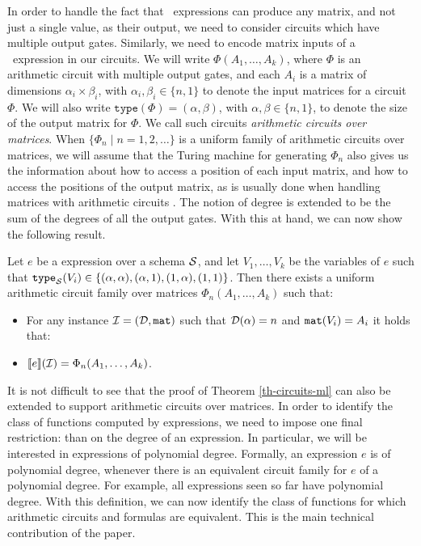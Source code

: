 In order to handle the fact that \langfor\ expressions can produce any matrix, and not just a single value, as their output, we need to consider circuits which have multiple output gates. Similarly, we need to encode matrix inputs of a \langfor\ expression in our circuits. We will write $\Phi(A_1,\ldots ,A_k)$, where $\Phi$ is an arithmetic circuit with multiple output gates, and each $A_i$ is a matrix of dimensions $\alpha_i\times \beta_i$, with $\alpha_i,\beta_i \in \{n,1\}$ to denote the input matrices for a circuit $\Phi$. We will also write $\texttt{type}(\Phi)=(\alpha,\beta)$, with $\alpha,\beta\in \{n,1\}$, to denote the size of the output matrix for $\Phi$. We call such circuits \textit{arithmetic circuits over matrices}. When $\{\Phi_n\mid n=1,2,\ldots\}$ is a uniform family of arithmetic circuits over matrices, we will assume that the Turing machine for generating $\Phi_n$ also gives us the information about how to access a position of each input matrix, and how to access the positions of the output matrix, as is usually done when handling matrices with arithmetic circuits \cite{Raz02}. The notion of degree is extended to be the sum of the degrees of all the output gates. With this  at hand, we can now show the following result.

\begin{theorem}
\label{th-ml-to-circuits}
Let $e$ be a \langfor expression over a schema $\mathcal{S}$, and let $V_1,\ldots ,V_k$ be the variables of $e$ such that $\texttt{type}_{\mathcal{S}}(V_i)\in \{(\alpha,\alpha), (\alpha,1), (1,\alpha), (1,1)\}$. Then there exists a uniform arithmetic circuit family over matrices $\Phi_n(A_1,\ldots ,A_k)$ such that:
\begin{itemize}
\item For any instance $\mathcal{I} = (\mathcal{D},\texttt{mat})$ such that $\mathcal{D}(\alpha) = n$ and $\texttt{mat}(V_i) = A_i$ it holds that:
\item $\llbracket e \rrbracket(\mathcal{I}) = \Phi_n(A_1,\ldots ,A_k)$.
\end{itemize}
\end{theorem}



It is not difficult to see that the proof of Theorem \ref{th-circuits-ml} can also be extended to support arithmetic circuits over matrices. In order to identify the class of functions computed by \langfor expressions, we need to impose one final restriction: than on the degree of an expression. 
In particular, we will be interested in \langfor expressions of polynomial degree. Formally, an expression $e$ is of polynomial degree, whenever there is an equivalent circuit family for $e$ of a polynomial degree.  
For example, all \langfor expressions seen so far have polynomial degree.
With this definition, we can now identify the class of functions for which arithmetic circuits and \langfor formulas are equivalent. This is the main technical contribution of the paper. 

